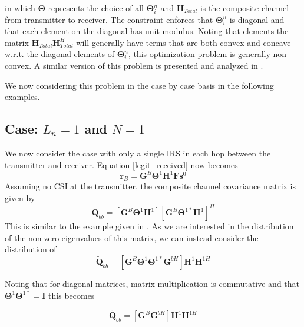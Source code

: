 \documentclass[12pt,a4paper]{report}
\begin{document}
in which $\boldsymbol{\Theta}$ represents the choice of all $\boldsymbol{\Theta}^n_i$ and $\mathbf{H}_{Total}$ is the composite channel from transmitter to receiver. The constraint enforces that $\boldsymbol{\Theta}^n_i$ is diagonal and that each element on the diagonal has unit modulus. 
Noting that elements the matrix  $\mathbf{H}_{Total}\mathbf{H}_{Total}^H$ will generally have terms that are both convex and concave w.r.t. the diagonal elements of $\boldsymbol{\Theta}^n_i$, this optimization problem is generally non-convex. A similar version of this problem is presented and analyzed in \cite{wu2019intelligent}.
\par
We now considering this problem in the case by case basis in the following examples. 


\subsection{Case: $L_n=1$ and $N=1$}
We now consider the case with only a single IRS in each hop between the transmitter and receiver. 
Equation \ref{legit_received} now becomes 
	\begin{equation}
\mathbf{r}_{B} =  \mathbf{G}^{B}\boldsymbol{\Theta}^{1}\mathbf{H}^{1}\mathbf{F}\mathbf{s}^0
\end{equation}
Assuming no CSI at the transmitter, the composite channel covariance matrix is given by 
\begin{equation}
\mathbf{Q}_{bb} = [\mathbf{G}^{B}\boldsymbol{\Theta}^{1}\mathbf{H}^{1}][\mathbf{G}^{B}\boldsymbol{\Theta}^{1*}\mathbf{H}^{1}]^H
\end{equation}
This is similar to the example given in \cite[Section 4.10]{muller2013applications}. As we are interested in the distribution of the non-zero eigenvalues of this matrix, we can instead consider the distribution of 
\begin{equation}
\tilde{\mathbf{Q}}_{bb} = [\mathbf{G}^{B}\boldsymbol{\Theta}^{1} \boldsymbol{\Theta}^{1*}\mathbf{G}^{bH}]\mathbf{H}^{1}\mathbf{H}^{1H}
\end{equation}

Noting that for diagonal matrices, matrix multiplication is commutative and that $\boldsymbol{\Theta}^{1}\boldsymbol{\Theta}^{1*} = \mathbf{I}$ this becomes

\begin{equation}
\tilde{\mathbf{Q}}_{bb} = [\mathbf{G}^{B}\mathbf{G}^{bH}]\mathbf{H}^{1}\mathbf{H}^{1H}
\end{equation}
\end{document}
